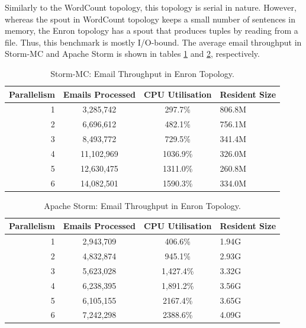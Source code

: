 Similarly to the WordCount topology, this topology is serial in nature. However, whereas the spout in  WordCount topology keeps a small number of sentences in memory, the Enron topology has a spout that produces tuples by reading from a file. Thus, this benchmark is mostly I/O-bound. The average email throughput in Storm-MC and Apache Storm is shown in tables \ref{table:storm_mc_enron} and \ref{table:storm_enron}, respectively. 

\begin{table}[!htb]
\begin{adjustwidth}{-0.5in}{-0.5in}
\centering
\small
\begin{tabular}{@{}rccl@{}}
    \textbf{Parallelism} & \textbf{Emails Processed} & \textbf{CPU Utilisation} & \textbf{Resident Size} \\ \toprule
    1 & {3,285,742} & {297.7\%} & {806.8M} \\
    2 & {6,696,612} & {482.1\%} & {756.1M} \\
    3 & {8,493,772} & {729.5\%} & {341.4M} \\
    4 & {11,102,969} & {1036.9\%} & {326.0M} \\
    5 & {12,630,475} & {1311.0\%} & {260.8M} \\
    6 & {14,082,501} & {1590.3\%} & {334.0M} \\
\end{tabular}
\caption{Storm-MC: Email Throughput in Enron Topology.}
\label{table:storm_mc_enron}
\end{adjustwidth}
\end{table}

\begin{table}[!htb]
\begin{adjustwidth}{-0.5in}{-0.5in}
\centering
\small
\begin{tabular}{@{}rccl@{}}
    \textbf{Parallelism} & \textbf{Emails Processed} & \textbf{CPU Utilisation} & \textbf{Resident Size} \\ \toprule
    1 & {2,943,709} & {406.6\%} & {1.94G} \\
    2 & {4,832,874} & {945.1\%} & {2.93G} \\
    3 & {5,623,028} & {1,427.4\%} & {3.32G} \\
    4 & {6,238,395} & {1,891.2\%} & {3.56G} \\
    5 & {6,105,155} & {2167.4\%} & {3.65G} \\
    6 & {7,242,298} & {2388.6\%} & {4.09G} \\
\end{tabular}
\caption{Apache Storm: Email Throughput in Enron Topology.}
\label{table:storm_enron}
\end{adjustwidth}
\end{table}

